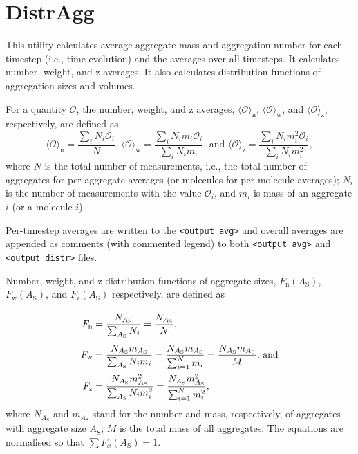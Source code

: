 \section{DistrAgg} \label{sec:DistrAgg}

This utility calculates average aggregate mass and aggregation number for
each timestep (i.e., time evolution) and the averages over all timesteps.
It calculates number, weight, and z averages. It also calculates
distribution functions of aggregation sizes and volumes.

For a quantity $\mathcal{O}$, the number, weight, and z averages,
$\langle\mathcal{O}\rangle_{\mathrm{n}}$,
$\langle\mathcal{O}\rangle_{\mathrm{w}}$, and
$\langle\mathcal{O}\rangle_{\mathrm{z}}$, respectively, are defined as
\begin{equation} \label{eq:Avg}
  \langle\mathcal{O}\rangle_{\mathrm{n}} = \frac{\sum_i N_i\mathcal{O}_i     }{N}
  \mbox{, \ \ \ }
  \langle\mathcal{O}\rangle_{\mathrm{w}} = \frac{\sum_i N_im_i\mathcal{O}_i  }{\sum_i N_i m_i}
  \mbox{, and \ \ \ }
  \langle\mathcal{O}\rangle_{\mathrm{z}} = \frac{\sum_i N_im_i^2\mathcal{O}_i}{\sum_i N_i m_i^2},
\end{equation}
where $N$ is the total number of measurements, i.e., the total number of
aggregates for per-aggregate averages (or molecules for per-molecule
averages); $N_i$ is the number of measurements with the value
$\mathcal{O}_i$, and $m_i$ is mass of an aggregate $i$ (or a molecule $i$).

Per-timestep averages are written to the \texttt{<output avg>} and overall
averages are appended as comments (with commented legend) to both
\texttt{<output avg>} and \texttt{<output distr>} files.

Number, weight, and z distribution functions of aggregate sizes,
$F_{\mathrm{n}}(A_{\mathrm{S}})$, $F_{\mathrm{w}}(A_{\mathrm{S}})$, and
$F_{\mathrm{z}}(A_{\mathrm{S}})$ respectively, are defined as
\begin{equation} \label{eq:Fnwz}
  \arraycolsep=1.4pt\def\arraystretch{2.5}
  \begin{array}{>{\displaystyle}rc>{\displaystyle}l}
    F_{\mathrm{n}} & = & \frac{N_{A_{\mathrm{S}} }}{\sum_{A_{\mathrm{S}} } N_i} =
    \frac{N_{A_{\mathrm{S}} }}{N}
  \mbox{,} \\
    F_{\mathrm{w}} & = & \frac{N_{A_{\mathrm{S}} } m_{A_{\mathrm{S}} }}{\sum_{A_{\mathrm{S}} } N_i m_i} =
    \frac{N_{A_{\mathrm{S}} } m_{A_{\mathrm{S}} }}{\sum_{i=1}^N m_i} =
    \frac{N_{A_{\mathrm{S}} } m_{A_{\mathrm{S}} }}{M}
  \mbox{, and} \\
    F_{\mathrm{z}} & = & \frac{N_{A_{\mathrm{S}} } m^2_{A_{\mathrm{S}}
    }}{\sum_{A_{\mathrm{S}} } N_i m_i^2} =
    \frac{N_{A_{\mathrm{S}} } m^2_{A_{\mathrm{S}} }}{\sum_{i=1}^N m_i^2}, \\
  \end{array}
\end{equation}
where $N_{A_{\mathrm{S}}}$ and $m_{A_{\mathrm{S}}}$ stand for the number
and mass, respectively, of aggregates with aggregate size $A_{\mathrm{S}}$;
$M$ is the total mass of all aggregates. The equations are normalised so
that $\sum F_x(A_{\mathrm{S}})=1$.

